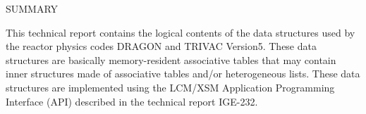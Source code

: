 \clearpage
$ $
\vskip 2.0cm

\begin{center}

SUMMARY

\end{center}

This technical report contains the logical contents of the data structures used by the reactor physics codes DRAGON and TRIVAC Version5. These data structures are basically memory-resident associative tables that may contain inner structures made of associative tables and/or heterogeneous lists. These data structures are implemented using the LCM/XSM Application Programming Interface (API) described in the technical report IGE-232.
